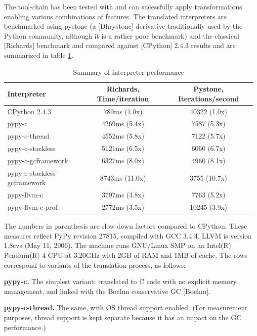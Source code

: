\documentclass{acm_proc_article-sp}
\begin{document}
The tool-chain has been tested with and can sucessfully apply
transformations enabling various combinations of features. The
translated interpreters are benchmarked using pystone (a [Dhrystone]
derivative traditionally used by the Python community, although it is
a rather poor benchmark) and the classical [Richards] benchmark and
compared against [CPython] 2.4.3 results and are summarized in table
\ref{perfsumm}.

\begin{table}
\centering
\caption{Summary of interpreter performance}
\label{perfsumm}
\begin{tabular}{|l|c|c|} \hline
\textbf{Interpreter} & 
\textbf{Richards, Time/iteration} &
\textbf{Pystone, Iterations/second} \\ \hline
CPython 2.4.3                &   789ms  (1.0x) & 40322  (1.0x) \\ \hline
pypy-c                       &  4269ms  (5.4x) &  7587  (5.3x) \\ \hline
pypy-c-thread                &  4552ms  (5.8x) &  7122  (5.7x) \\ \hline
pypy-c-stackless             &  5121ms  (6.5x) &  6060  (6.7x) \\ \hline
pypy-c-gcframework           &  6327ms  (8.0x) &  4960  (8.1x) \\ \hline
pypy-c-stackless-gcframework &  8743ms (11.0x) &  3755 (10.7x) \\ \hline
pypy-llvm-c                  &  3797ms  (4.8x) &  7763  (5.2x) \\ \hline
pypy-llvm-c-prof             &  2772ms  (3.5x) & 10245  (3.9x) \\ \hline
\end{tabular}
\end{table}

The numbers in parenthesis are slow-down factors compared to CPython.
These measures reflect PyPy revision 27815, compiled with GCC 3.4.4.
LLVM is version 1.8cvs (May 11, 2006).  The machine runs GNU/Linux SMP
on an Intel(R) Pentium(R) 4 CPU at 3.20GHz with 2GB of RAM and 1MB of
cache.  The rows correspond to variants of the translation process, as
follows:

{\bf pypy-c.}
    The simplest variant: translated to C code with no explicit memory
    management, and linked with the Boehm conservative GC [Boehm].

{\bf pypy-c-thread.}
    The same, with OS thread support enabled.  (For measurement purposes,
    thread support is kept separate because it has an impact on the GC
    performance.)
\end{document}
